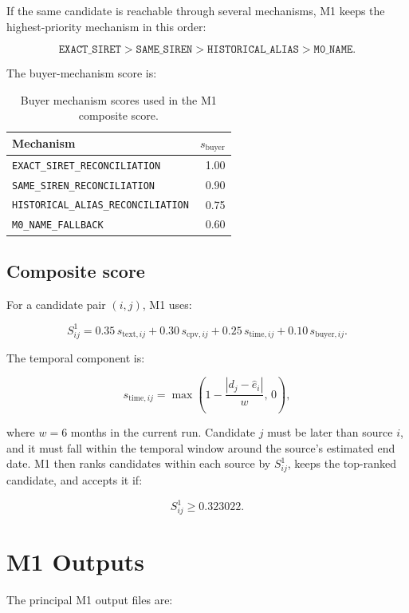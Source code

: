 \documentclass[11pt]{article}
\begin{document}
If the same candidate is reachable through several mechanisms, M1 keeps
the highest-priority mechanism in this order:

\[
\texttt{EXACT\_SIRET}
>
\texttt{SAME\_SIREN}
>
\texttt{HISTORICAL\_ALIAS}
>
\texttt{M0\_NAME}.
\]

The buyer-mechanism score is:

\begin{table}[h]
\centering
\caption{Buyer mechanism scores used in the M1 composite score.}
\begin{tabular}{lr}
\toprule
Mechanism & \(s_{\mathrm{buyer}}\)\\
\midrule
\texttt{EXACT\_SIRET\_RECONCILIATION} & 1.00\\
\texttt{SAME\_SIREN\_RECONCILIATION} & 0.90\\
\texttt{HISTORICAL\_ALIAS\_RECONCILIATION} & 0.75\\
\texttt{M0\_NAME\_FALLBACK} & 0.60\\
\bottomrule
\end{tabular}
\end{table}

\subsection{Composite score}

For a candidate pair \((i,j)\), M1 uses:

\[
S_{ij}^{1}
=
0.35\,s_{\mathrm{text},ij}
+0.30\,s_{\mathrm{cpv},ij}
+0.25\,s_{\mathrm{time},ij}
+0.10\,s_{\mathrm{buyer},ij}.
\]

The temporal component is:

\[
s_{\mathrm{time},ij}
=
\max\left(1-\frac{|d_j-\hat{e}_i|}{w},\,0\right),
\]

where \(w=6\) months in the current run. Candidate \(j\) must be later
than source \(i\), and it must fall within the temporal window around the
source's estimated end date. M1 then ranks candidates within each source by
\(S_{ij}^{1}\), keeps the top-ranked candidate, and accepts it if:

\[
S_{ij}^{1} \ge 0.323022.
\]

\section{M1 Outputs}
\label{sec:outputs}

The principal M1 output files are:
\end{document}
